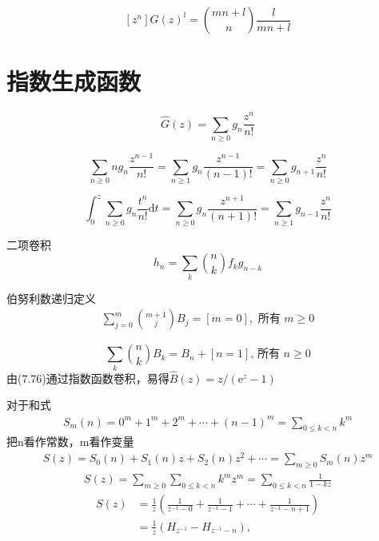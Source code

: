 \begin{equation}
    \left[z^{n}\right] G(z)^{l}={m n+l  \choose n} \frac{l}{m n+l}
\end{equation}

\section{指数生成函数}
\setcounter{equation}{71}
\begin{equation}
    \hat{G}(z)=\sum_{n \geqslant 0} g_{n} \frac{z^{n}}{n !}
\end{equation}

\begin{equation}
    \sum_{n \geqslant 0} n g_{n} \frac{z^{n-1}}{n !}=\sum_{n \geqslant 1} g_{n} \frac{z^{n-1}}{(n-1) !}=\sum_{n \geqslant 0} g_{n+1} \frac{z^{n}}{n !}
\end{equation}

\begin{equation}
    \int_{0}^{z} \sum_{n \geqslant 0} g_{n} \frac{t^{n}}{n !} \mathrm{d} t=\sum_{n \geqslant 0} g_{n} \frac{z^{n+1}}{(n+1) !}=\sum_{n \geqslant 1} g_{n-1} \frac{z^{n}}{n !}
\end{equation}

二项卷积
\begin{equation}
    h_{n}=\sum_{k}{n  \choose k} f_{k} g_{n-k}
\end{equation}

伯努利数递归定义
\begin{align*}
    \sum_{j=0}^{m}{m+1  \choose j} B_{j}=[m=0], \text { 所有 } m \geqslant 0
\end{align*}

\begin{equation}
    \sum_{k}{n  \choose k} B_{k}=B_{n}+[n=1] \text {, 所有 } n \geqslant 0 
\end{equation}
由(7.76)通过指数函数卷积，易得$\hat{B}(z)=z /\left(\mathrm{e}^{z}-1\right)$

对于和式
\begin{align*}
    S_{m}(n)=0^{m}+1^{m}+2^{m}+\cdots+(n-1)^{m}=\sum_{0 \leqslant k<n} k^{m}
\end{align*}
把n看作常数，m看作变量
\begin{align*}
    S(z)=S_{0}(n)+S_{1}(n) z+S_{2}(n) z^{2}+\cdots=\sum_{m \geqslant 0} S_{m}(n) z^{m}
\end{align*}
\begin{align*}
    S(z)=\sum_{m \geqslant 0} \sum_{0 \leqslant k<n} k^{m} z^{m}=\sum_{0 \leqslant k<n} \frac{1}{1-k z}
\end{align*}
\begin{equation}
    \begin{aligned}
    S(z) &=\frac{1}{z}\left(\frac{1}{z^{-1}-0}+\frac{1}{z^{-1}-1}+\cdots+\frac{1}{z^{-1}-n+1}\right) \\
    &=\frac{1}{z}\left(H_{z^{-1}}-H_{z^{-1}-n}\right),
    \end{aligned}
\end{equation}

